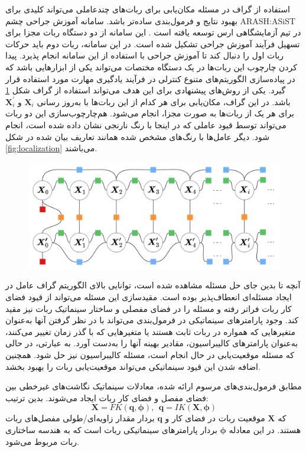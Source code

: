 استفاده از گراف در مسئله مکان‌یابی برای ربات‌های چندعاملی می‌تواند کلیدی برای بهبود نتایج و فرمول‌بندی ساده‌تر باشد. سامانه آموزش جراحی چشم 
ARASH:ASiST 
در تیم آزمایشگاهی ارس توسعه یافته است
\cite{hassani2021kinematic}
. این سامانه از دو دستگاه ربات مجزا برای تسهیل فرآیند آموزش جراحی تشکیل شده است. در این سامانه، ربات دوم باید حرکات ربات اول را دنبال کند تا آموزش جراحی با استفاده از این سامانه انجام پذیرد. پیدا کردن چارچوب این ربات‌ها در یک دستگاه مختصات می‌تواند یکی از ابزارهایی باشد که در پیاده‌سازی الگوریتم‌های متنوع کنترلی در فرآیند یادگیری مهارت مورد استفاده قرار گیرد. یکی از روش‌های پیشنهادی برای این هدف می‌تواند استفاده از گراف شکل 
\ref{fig:arashasistlocalization}
باشد. در این گراف، مکان‌یابی برای هر کدام از این ربات‌ها با به‌روز رسانی
$\boldsymbol{X}_{i}$
و
$\boldsymbol{X}_{i}^{'}$
برای هر یک از ربات‌ها به صورت مجزا، انجام می‌شود. هم‌چارچوب‌سازی این دو ربات می‌تواند توسط قیود عاملی که در اینجا با رنگ نارنجی نشان داده شده است، انجام شود. دیگر عامل‌ها با رنگ‌های مشخص شده همانند تعاریف بیان شده در شکل 
\ref{fig:localization}
می‌باشند. 

\begin{figure}
	\centering
	\includegraphics[width=0.7\linewidth]{img/Arash_Asist_localization}
	\caption{}
	\label{fig:arashasistlocalization}
\end{figure}


آنچه تا بدین جای حل مسئله مشاهده شده است، توانایی بالای الگوریتم گراف عامل در ایجاد مسئله‌ای انعطاف‌پذیر بوده است. مقیدسازی این مسئله می‌تواند از قیود فضای کار ربات فراتر رفته و مسئله را در فضای مفصلی و ساختار سینماتیک ربات نیز مقید کند. وجود پارامترهای سینماتیکی در فرمول‌بندی می‌تواند با در نظر گرفتن آنها به‌عنوان متغیرهایی که همواره در ربات ثابت هستند یا متغیرهایی که با گذر زمان تغییر می‌کنند، به‌عنوان پارامترهای کالیبراسیون، مقادیر بهینه آنها را به‌دست آورد. به عبارتی، در حالی که مسئله موقعیت‌یابی در حال انجام است، مسئله کالیبراسیون نیز حل شود. همچنین اضافه شدن این قیود سینماتیکی می‌تواند موقعیت‌یابی ربات را بهبود بخشد.

مطابق فرمول‌بندی‌های مرسوم ارائه شده، معادلات سینماتیک نگاشت‌های غیرخطی بین فضای مفصل و فضای کار ربات ایجاد می‌شوند. بدین ترتیب:
\begin{equation} \label{eq:IK_FK_genral_equations}
	\boldsymbol{X} = FK(\boldsymbol{q}, \boldsymbol{\phi}), ~~ \boldsymbol{q} = IK(\boldsymbol{X}, \boldsymbol{\phi})
\end{equation}
که
$\boldsymbol{X}$
موقعیت ربات در فضای کار و
$\boldsymbol{q}$
بردار مقدار زاویه‌ای/طولی مفصل‌های ربات هستند. در این معادله
$\boldsymbol{\phi}$
بردار پارامترهای سینماتیکی ربات است که به هندسه ساختاری ربات مربوط می‌شود.

